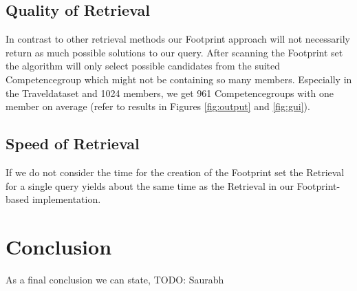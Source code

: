 \documentclass[11pt]{article}
\begin{document}
\subsection{Quality of Retrieval}
In contrast to other retrieval methods our Footprint approach will not necessarily return as much possible solutions to our query. After scanning the Footprint set the algorithm will only select possible candidates from the suited Competencegroup which might not be containing so many members. Especially in the Traveldataset and 1024 members, we get 961 Competencegroups with one member on average (refer to results in Figures \ref{fig:output} and \ref{fig:gui}).\\[1em]


\subsection{Speed of Retrieval}
If we do not consider the time for the creation of the Footprint set the Retrieval for a single query yields about the same time as the Retrieval in our Footprint-based implementation.

\section{Conclusion}
As a final conclusion we can state, 
TODO: Saurabh


%
%
\nocite{FPBR}
\nocite{FPBR2}



%
%
\end{document}
